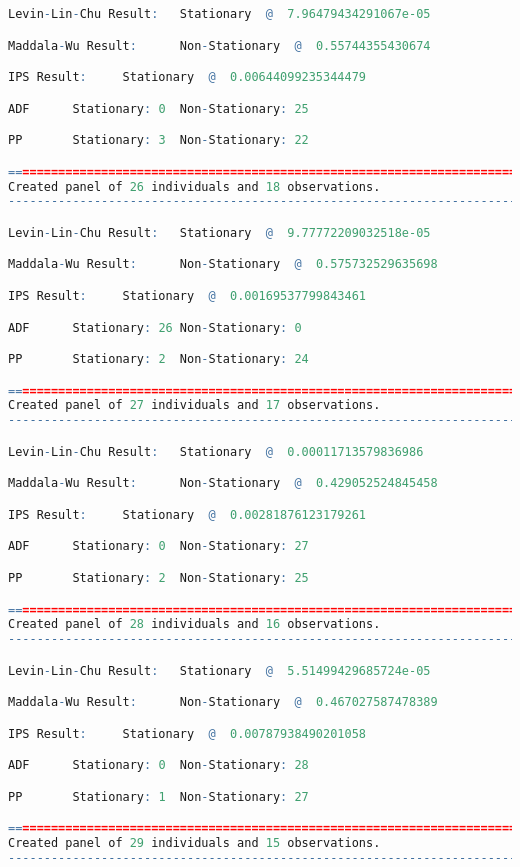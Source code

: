 \begin{lstlisting}[language=R]
Levin-Lin-Chu Result:   Stationary  @  7.96479434291067e-05

Maddala-Wu Result:      Non-Stationary  @  0.55744355430674

IPS Result:     Stationary  @  0.00644099235344479

ADF      Stationary: 0  Non-Stationary: 25

PP       Stationary: 3  Non-Stationary: 22

=========================================================================
Created panel of 26 individuals and 18 observations.
-------------------------------------------------------------------------

Levin-Lin-Chu Result:   Stationary  @  9.77772209032518e-05

Maddala-Wu Result:      Non-Stationary  @  0.575732529635698

IPS Result:     Stationary  @  0.00169537799843461

ADF      Stationary: 26 Non-Stationary: 0

PP       Stationary: 2  Non-Stationary: 24

=========================================================================
Created panel of 27 individuals and 17 observations.
-------------------------------------------------------------------------

Levin-Lin-Chu Result:   Stationary  @  0.00011713579836986

Maddala-Wu Result:      Non-Stationary  @  0.429052524845458

IPS Result:     Stationary  @  0.00281876123179261

ADF      Stationary: 0  Non-Stationary: 27

PP       Stationary: 2  Non-Stationary: 25

=========================================================================
Created panel of 28 individuals and 16 observations.
-------------------------------------------------------------------------

Levin-Lin-Chu Result:   Stationary  @  5.51499429685724e-05

Maddala-Wu Result:      Non-Stationary  @  0.467027587478389

IPS Result:     Stationary  @  0.00787938490201058

ADF      Stationary: 0  Non-Stationary: 28

PP       Stationary: 1  Non-Stationary: 27

=========================================================================
Created panel of 29 individuals and 15 observations.
-------------------------------------------------------------------------


\end{lstlisting}
